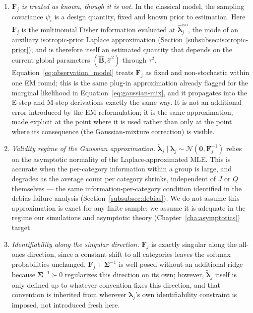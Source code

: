 \begin{enumerate}
\item[(A1)] \emph{$\mathbf F_j$ is treated as known, though it is not.} In the classical model, the sampling covariance $\psi_i$ is a design quantity, fixed and known prior to estimation. Here $\mathbf F_j$ is the multinomial Fisher information evaluated at $\hat{\bm\lambda}_j^{\text{iso}}$, the mode of an auxiliary isotropic-prior Laplace approximation (Section~\ref{subsubsec:isotropic-prior}), and is therefore itself an estimated quantity that depends on the current global parameters $(\hat{\mathbf{B}},\hat\sigma^2)$ through $\tau^2$. Equation~\eqref{eq:observation_model} treats $\mathbf F_j$ as fixed and non-stochastic within one EM round; this is the same plug-in approximation already flagged for the marginal likelihood in Equation~\eqref{eq:gaussian-mix}, and it propagates into the E-step and M-step derivations exactly the same way. It is not an additional error introduced by the EM reformulation; it is the same approximation, made explicit at the point where it is used rather than only at the point where its consequence (the Gaussian-mixture correction) is visible.

\item[(A2)] \emph{Validity regime of the Gaussian approximation.} $\tilde{\bm\lambda}_j\mid\bm\lambda_j\sim\mathcal N(\bm 0,\mathbf F_j^{-1})$ relies on the asymptotic normality of the Laplace-approximated MLE. This is accurate when the per-category information within a group is large, and degrades as the average count per category shrinks, independent of $J$ or $Q$ themselves --- the same information-per-category condition identified in the debias failure analysis (Section~\ref{subsubsec:debias}). We do not assume this approximation is exact for any finite sample; we assume it is adequate in the regime our simulations and asymptotic theory (Chapter~\ref{cha:asymptotics}) target.

\item[(A4)] \emph{Identifiability along the singular direction.} $\mathbf F_j$ is exactly singular along the all-ones direction, since a constant shift to all categories leaves the softmax probabilities unchanged. $\mathbf F_j+\bm\Sigma^{-1}$ is well-posed without an additional ridge because $\bm\Sigma^{-1}\succ0$ regularizes this direction on its own; however, $\tilde{\bm\lambda}_j$ itself is only defined up to whatever convention fixes this direction, and that convention is inherited from wherever $\bm\lambda_j$'s own identifiability constraint is imposed, not introduced fresh here.


\end{enumerate}
